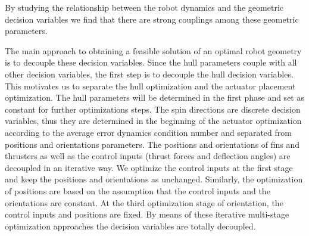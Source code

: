 

By studying the relationship between the robot dynamics and the geometric decision variables we find that there are strong couplings among these geometric parameters. 

The main approach to obtaining a feasible solution of an optimal robot geometry is to decouple these decision variables. Since the hull parameters couple with all other decision variables, the first step is to decouple the hull decision variables. This motivates us to separate the hull optimization and the actuator placement optimization. The hull parameters will be determined in the first phase and set as constant for further optimizations steps. The spin directions are discrete decision variables, thus they are determined in the beginning of the actuator optimization according to the average error dynamics condition number and separated from positions and orientations parameters. The positions and orientations of fins and thrusters as well as the control inputs (thrust forces and deflection angles) are decoupled in an iterative way. We optimize the control inputs at the first stage and keep the positions and orientations as unchanged. Similarly, the optimization of positions are based on the assumption that the control inputs and the orientations are constant. At the third optimization stage of orientation, the control inputs and positions are fixed. By means of these iterative multi-stage optimization approaches the decision variables are totally decoupled. 

